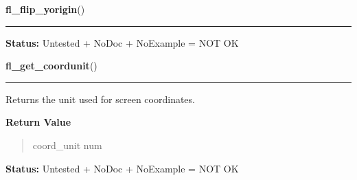     \vspace{0.5ex}

\hspace{.8\funcindent}\begin{boxedminipage}{\funcwidth}

    \raggedright \textbf{fl\_flip\_yorigin}()

    \vspace{-1.5ex}

    \rule{\textwidth}{0.5\fboxrule}
\setlength{\parskip}{2ex}
\setlength{\parskip}{1ex}
\textbf{Status:} Untested + NoDoc + NoExample = NOT OK



    \end{boxedminipage}

    \label{xformslib:library:fl_get_coordunit}

    \vspace{0.5ex}

\hspace{.8\funcindent}\begin{boxedminipage}{\funcwidth}

    \raggedright \textbf{fl\_get\_coordunit}()

    \vspace{-1.5ex}

    \rule{\textwidth}{0.5\fboxrule}
\setlength{\parskip}{2ex}
    Returns the unit used for screen coordinates.

\setlength{\parskip}{1ex}
      \textbf{Return Value}
    \vspace{-1ex}

      \begin{quote}
      coord\_unit num

      \end{quote}

\textbf{Status:} Untested + NoDoc + NoExample = NOT OK



    \end{boxedminipage}

    \label{xformslib:library:fl_get_border_width}

    \vspace{0.5ex}

